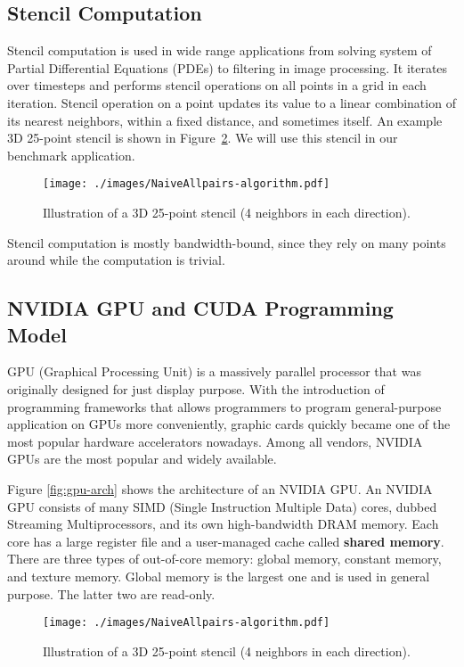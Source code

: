 \subsection{Stencil Computation}
Stencil computation is used in wide range applications from solving system of Partial Differential Equations (PDEs) to filtering in image processing. It iterates over timesteps and performs stencil operations on all points in a grid in each iteration. Stencil operation on a point updates its value to a linear combination of its nearest neighbors, within a fixed distance, and sometimes itself. An example 3D 25-point stencil is shown in Figure~\ref{fig:25-point_stencil}. We will use this stencil in our benchmark application.

\begin{figure}
\centering
\texttt{[image: ./images/NaiveAllpairs-algorithm.pdf]}
\caption{Illustration of a 3D 25-point stencil (4 neighbors in each direction).}
\label{fig:25-point_stencil}
\end{figure}

Stencil computation is mostly bandwidth-bound, since they rely on many points around while the computation is trivial.

\subsection{NVIDIA GPU and CUDA Programming Model}
GPU (Graphical Processing Unit) is a massively parallel processor that was originally designed for just display purpose. With the introduction of programming frameworks that allows programmers to program general-purpose application on GPUs more conveniently, graphic cards quickly became one of the most popular hardware accelerators nowadays. Among all vendors, NVIDIA GPUs are the most popular and widely available.

Figure \ref{fig:gpu-arch} shows the architecture of an NVIDIA GPU. An NVIDIA GPU consists of many SIMD (Single Instruction Multiple Data) cores, dubbed Streaming Multiprocessors, and its own high-bandwidth DRAM memory. Each core has a large register file and a user-managed cache called \textbf{shared memory}. There are three types of out-of-core memory: global memory, constant memory, and texture memory. Global memory is the largest one and is used in general purpose. The latter two are read-only.

\begin{figure}
\centering
\texttt{[image: ./images/NaiveAllpairs-algorithm.pdf]}
\caption{Illustration of a 3D 25-point stencil (4 neighbors in each direction).}
\label{fig:25-point_stencil}
\end{figure}


